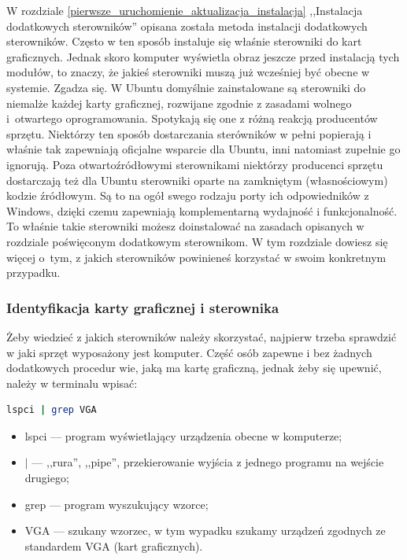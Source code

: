 \label{sterowniki}
W rozdziale \ref{pierwsze_uruchomienie_aktualizacja_instalacja} ,,Instalacja dodatkowych sterowników'' opisana została metoda instalacji dodatkowych sterowników. Często w ten sposób instaluje się właśnie sterowniki do kart graficznych. Jednak skoro komputer wyświetla obraz jeszcze przed instalacją tych modułów, to znaczy, że jakieś sterowniki muszą już wcześniej być obecne w systemie. Zgadza się. W Ubuntu domyślnie zainstalowane są sterowniki do niemalże każdej karty graficznej, rozwijane zgodnie z zasadami wolnego i~otwartego oprogramowania. Spotykają się one z różną reakcją producentów sprzętu. Niektórzy ten sposób dostarczania sterówników w pełni popierają i właśnie tak zapewniają oficjalne wsparcie dla Ubuntu, inni natomiast zupełnie go ignorują. Poza otwartoźródłowymi sterownikami niektórzy producenci sprzętu dostarczają też dla Ubuntu sterowniki oparte na zamkniętym (własnościowym) kodzie źródłowym. Są to na ogół swego rodzaju porty ich odpowiedników z Windows, dzięki czemu zapewniają komplementarną wydajność i funkcjonalność. To właśnie takie sterowniki możesz doinstalować na zasadach opisanych w rozdziale poświęconym dodatkowym sterownikom. W tym rozdziale dowiesz się więcej o~tym, z jakich sterowników powinieneś korzystać w swoim konkretnym przypadku.

\subsubsection{Identyfikacja karty graficznej i sterownika}
Żeby wiedzieć z jakich sterowników należy skorzystać, najpierw trzeba sprawdzić w jaki sprzęt wyposażony jest komputer. Część osób zapewne i bez żadnych dodatkowych procedur wie, jaką ma kartę graficzną, jednak żeby się upewnić, należy w terminalu wpisać:

\begin{lstlisting}[language=bash]
lspci | grep VGA
\end{lstlisting}
\begin{itemize}
\item \textcolor{ubuntu_orange}{lspci} --- program wyświetlający urządzenia obecne w komputerze;
\item \textcolor{ubuntu_orange}{$|$} --- ,,rura'', ,,pipe'', przekierowanie wyjścia z jednego programu na wejście drugiego;
\item \textcolor{ubuntu_orange}{grep} --- program wyszukujący wzorce;
\item \textcolor{ubuntu_orange}{VGA} --- szukany wzorzec, w tym wypadku szukamy urządzeń zgodnych ze standardem VGA (kart graficznych).
\end{itemize}

